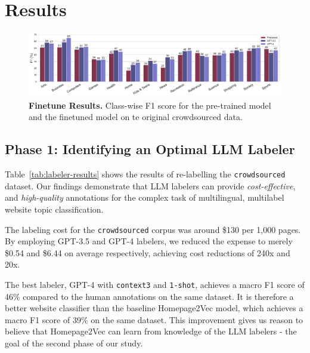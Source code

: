 \section{Results}

\begin{figure}[h]
    \centering
    \includegraphics[width=1\textwidth]{./figures/finetune-results.pdf}
    \caption{\textbf{Finetune Results.} Class-wise F1 score for the pre-trained model and the finetuned model on te original crowdsourced data.}
    \label{fig:finetune-results}
\end{figure}


\subsection*{Phase 1: Identifying an Optimal LLM Labeler}

Table~\ref{tab:labeler-results} shows the results of re-labelling the \texttt{crowdsourced} dataset. Our findings demonstrate that LLM labelers can provide \textit{cost-effective}, and \textit{high-quality} annotations for the complex task of multilingual, multilabel website topic classification. 

The labeling cost for the \texttt{crowdsourced} corpus was around \$130 per 1,000 pages. By employing GPT-3.5 and GPT-4 labelers, we reduced the expense to merely \$0.54 and \$6.44 on average respectively, achieving cost reductions of 240x and 20x.





The best labeler, GPT-4 with \texttt{context3} and \texttt{1-shot}, achieves a macro F1 score of 46\% compared to the human annotations on the same dataset. It is therefore a better website classifier than the baseline Homepage2Vec model, which achieves a macro F1 score of 39\% on the same dataset. This improvement gives us reason to believe that Homepage2Vec can learn from knowledge of the LLM labelers - the goal of the second phase of our study.

